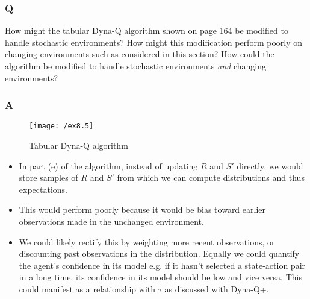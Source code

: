 \subsubsection{Q}
How might the tabular Dyna-Q algorithm shown on page 164 be modified to handle stochastic environments? How might this modification perform poorly on changing environments such as considered in this section? How could the algorithm be modified to handle stochastic environments \textit{and} changing environments?
\subsubsection{A}
\begin{figure}[h!]
	\centering
	\texttt{[image: /ex8.5]}
	\caption{Tabular Dyna-Q algorithm}
	\label{fig: dyna-Q}
\end{figure}
\begin{itemize}
\item In part (e) of the algorithm, instead of updating $R$ and $S'$ directly, we would store samples of $R$ and $S'$ from which we can compute distributions and thus expectations. 
\item This would perform poorly because it would be bias toward earlier observations made in the unchanged environment.
\item We could likely rectify this by weighting more recent observations, or discounting past observations in the distribution. Equally we could quantify the agent's confidence in its model e.g. if it hasn't selected a state-action pair in a long time, its confidence in its model should be low and vice versa. This could manifest as a relationship with $\tau$ as discussed with Dyna-Q+.
\end{itemize}